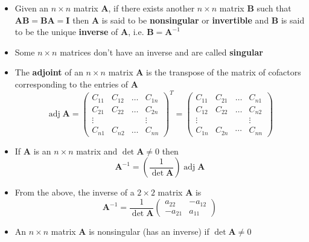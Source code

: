 \documentclass{article}
\newcommand{\adj}{\operatorname{adj}}
\begin{document}
\begin{itemize}
  \item Given an $n \times n$ matrix $\mathbf{A}$, if there exists another $n \times n$ matrix $\mathbf{B}$ such that $\mathbf{A} \mathbf{B} = \mathbf{B} \mathbf{A} = \mathbf{I}$ then $\mathbf{A}$ is said to be \textbf{nonsingular} or \textbf{invertible} and $\mathbf{B}$ is said to be the unique \textbf{inverse} of $\mathbf{A}$, i.e. $\mathbf{B} = \mathbf{A}^{-1}$

  \item Some $n \times n$ matrices don't have an inverse and are called \textbf{singular}

  \item The \textbf{adjoint} of an $n \times n$ matrix $\mathbf{A}$ is the transpose of the matrix of cofactors corresponding to the entries of $\mathbf{A}$ \[\adj \mathbf{A} = \begin{pmatrix}
            C_{11} & C_{12} & \ldots & C_{1n} \\
            C_{21} & C_{22} & \ldots & C_{2n} \\
            \vdots &        &        & \vdots \\
            C_{n1} & C_{n2} & \ldots & C_{nn}
          \end{pmatrix}^T = \begin{pmatrix}
            C_{11} & C_{21} & \ldots & C_{n1} \\
            C_{12} & C_{22} & \ldots & C_{n2} \\
            \vdots &        &        & \vdots \\
            C_{1n} & C_{2n} & \cdots & C_{nn}
          \end{pmatrix}\]

  \item If $\mathbf{A}$ is an $n \times n$ matrix and $\det \mathbf{A} \ne 0$ then \[\mathbf{A}^{-1} = \left( \frac{1}{\det \mathbf{A}} \right) \adj \mathbf{A}\]

  \item From the above, the inverse of a $2 \times 2$ matrix $\mathbf{A}$ is \[\mathbf{A}^{-1} = \frac{1}{\det \mathbf{A}} \begin{pmatrix}
            a_{22}  & -a_{12} \\
            -a_{21} & a_{11}
          \end{pmatrix}\]

  \item An $n \times n$ matrix $\mathbf{A}$ is nonsingular (has an inverse) if $\det \mathbf{A} \ne 0$
\end{itemize}
\end{document}
